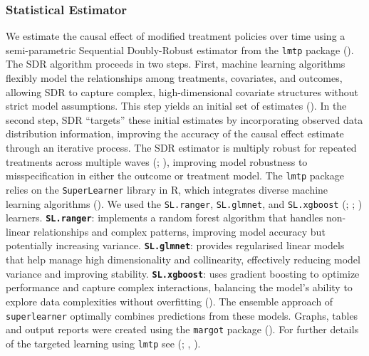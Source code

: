 \documentclass[
  single column]{article}
\begin{document}
\subsubsection{Statistical Estimator}\label{statistical-estimator}

We estimate the causal effect of modified treatment policies over time
using a semi-parametric Sequential Doubly-Robust estimator from the
\texttt{lmtp} package (). The SDR algorithm proceeds in two steps. First, machine learning
algorithms flexibly model the relationships among treatments,
covariates, and outcomes, allowing SDR to capture complex,
high-dimensional covariate structures without strict model assumptions.
This step yields an initial set of estimates
(). In the second
step, SDR ``targets'' these initial estimates by incorporating observed
data distribution information, improving the accuracy of the causal
effect estimate through an iterative process. The SDR estimator is
multiply robust for repeated treatments across multiple waves
(;
), improving model
robustness to misspecification in either the outcome or treatment model.
The \texttt{lmtp} package relies on the \texttt{SuperLearner} library in
R, which integrates diverse machine learning algorithms
(). We used
the \texttt{SL.ranger}, \texttt{SL.glmnet}, and \texttt{SL.xgboost}
(;
;
) learners.
\textbf{\texttt{SL.ranger}}: implements a random forest algorithm that
handles non-linear relationships and complex patterns, improving model
accuracy but potentially increasing variance.
\textbf{\texttt{SL.glmnet}}: provides regularised linear models that
help manage high dimensionality and collinearity, effectively reducing
model variance and improving stability. \textbf{\texttt{SL.xgboost}}:
uses gradient boosting to optimize performance and capture complex
interactions, balancing the model's ability to explore data complexities
without overfitting (). The ensemble approach of \texttt{superlearner} optimally
combines predictions from these models. Graphs, tables and output
reports were created using the \texttt{margot} package
(). For further details of the
targeted learning using \texttt{lmtp} see
(;
,
).
\end{document}
